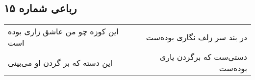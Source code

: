 \begin{center}
\section*{رباعی شماره ۱۵}
\label{sec:sh015}
\begin{longtable}{l p{0.5cm} r}
این کوزه چو من عاشق زاری بوده است
&&
در بند سر زلف نگاری بوده‌ست
\\
این دسته که بر گردن او می‌بینی
&&
دستی‌ست که برگردن یاری بوده‌ست
\\
\end{longtable}
\end{center}
